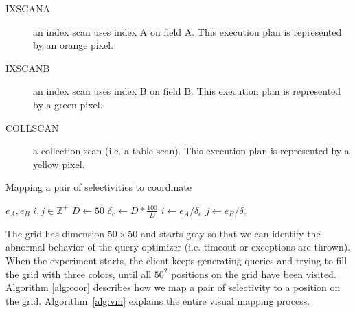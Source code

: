 \begin{description}
     \item [IXSCAN\textunderscore A] an index scan uses index A on field A. This execution plan is represented by an orange pixel. 
    \item [IXSCAN\textunderscore B] an index scan uses index B on field B. This execution plan is represented by a green pixel. 
    \item [COLLSCAN] a collection scan (i.e. a table scan). This execution plan is represented by a yellow pixel.
\end{description}

\begin{algorithm}[htb]
    \caption{Mapping a pair of selectivities to coordinate}
    \begin{algorithmic}
        
        \STATE $e_A, e_B$ 
        \STATE $i, j \in \mathbb{Z}^+$ 
        \STATE $D \gets 50$ 
        \STATE $\delta_e \gets  D*{\frac{100}{D}}$ 
        \STATE $i \gets e_A / \delta_e$
        \STATE $j \gets e_B / \delta_e$
        
    \end{algorithmic}
    \label{alg:coor}
\end{algorithm}

The grid has dimension $50 \times 50$ and starts gray so that we can identify the abnormal behavior of the query optimizer (i.e. timeout or exceptions are thrown). When the experiment starts, the client keeps generating queries and trying to fill the grid with three colors, until all $50^2$ positions on the grid have been visited. Algorithm \ref{alg:coor} describes how we map a pair of selectivity to a position on the grid. Algorithm~\ref{alg:vm} explains the entire visual mapping process.

